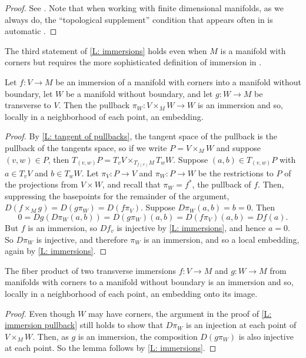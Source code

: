 \begin{proof}
	See \cite[Theorem 3.2.6, Proposition 3.2.13, and Definition 3.3.1]{MaDo92}.
	Note that when working with finite dimensional manifolds, as we always do, the ``topological supplement'' condition that appears often in \cite{MaDo92} is automatic \cite[page 7]{MaDo92}.
\end{proof}

The third statement of \cref{L: immersions} holds even when $M$ is a manifold with corners but requires the more sophisticated definition of immersion in \cite{MaDo92}.

\begin{lemma}\label{L: immersion pullback}
	Let $f \colon V \to M$ be an immersion of a manifold with corners into a manifold without boundary, let $W$ be a manifold without boundary, and let $g \colon W \to M$ be transverse to $V$.
	Then the pullback $\pi_W: V \times_M W \to W$ is an immersion and so, locally in a neighborhood of each point, an embedding.
\end{lemma}

\begin{proof}
	By \cref{L: tangent of pullbacks}, the tangent space of the pullback is the pullback of the tangents space, so if we write $P = V \times_M W$ and suppose $(v,w) \in P$, then $T_{(v,w)}P = T_vV \times_{T_{f(v)}M} T_wW$.
	Suppose $(a,b) \in T_{(v,w)}P$ with $a \in T_vV$ and $b \in T_wW$.
	Let $\pi_V \colon P \to V$ and $\pi_W \colon P \to W$ be the restrictions to $P$ of the projections from $V \times W$, and recall that $\pi_W = f^*$, the pullback of $f$.
	Then, suppressing the basepoints for the remainder of the argument, $D(f \times_M g) = D(g\pi_W) = D(f \pi_V)$.
	Suppose $D\pi_W(a,b)= b = 0$.
	Then $$0 = Dg(D\pi_W(a,b))= D(g\pi_W)(a,b) = D(f \pi_V)(a,b) = Df(a).$$
	But $f$ is an immersion, so $Df_v$ is injective by \cref{L: immersions}, and hence $a=0$.
	So $D\pi_W$ is injective, and therefore $\pi_W$ is an immersion, and so a local embedding, again by \cref{L: immersions}.
\end{proof}

\begin{lemma}
	The fiber product of two transverse immersions $f \colon V \to M$ and $g \colon W \to M$ from manifolds with corners to a manifold without boundary is an immersion and so, locally in a neighborhood of each point, an embedding onto its image.
\end{lemma}

\begin{proof}
	Even though $W$ may have corners, the argument in the proof of \cref{L: immersion pullback} still holds to show that $D \pi_W$ is an injection at each point of $V \times_M W$.
	Then, as $g$ is an immersion, the composition $D(g \pi_W)$ is also injective at each point.
	So the lemma follows by \cref{L: immersions}.
\end{proof}

